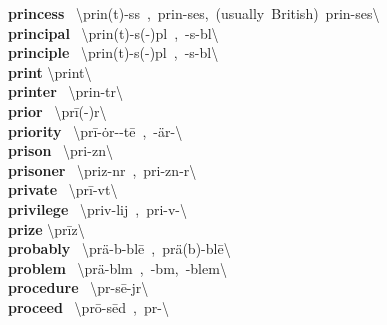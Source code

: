 \documentclass[10pt,a4paper]{article}
\begin{document}
\begin{multicols}{2}
\textbf{ princess }\quad \ \textbackslash \textprimstress prin(t)-s\textschwa s\ ,\ \textprimstress prin-\textsecstress ses,\ (usually\ British)\ prin-\textprimstress ses\textbackslash \\
\textbf{ principal }\quad \ \textbackslash \textprimstress prin(t)-s(\textschwa -)p\textschwa l\ ,\ -s\textschwa -b\textschwa l\textbackslash \\
\textbf{ principle }\quad \ \textbackslash \textprimstress prin(t)-s(\textschwa -)p\textschwa l\ ,\ -s\textschwa -b\textschwa l\textbackslash \\
\textbf{ print }\quad \textbackslash \textprimstress print\textbackslash \\
\textbf{ printer }\quad \ \textbackslash \textprimstress prin-t\textschwa r\textbackslash \\
\textbf{ prior }\quad \ \textbackslash \textprimstress pr\={i}(-\textschwa )r\textbackslash \\
\textbf{ priority }\quad \ \textbackslash pr\={i}-\textprimstress \.{o}r-\textschwa -t\={e}\ ,\ -\textprimstress \"{a}r-\textbackslash \\
\textbf{ prison }\quad \ \textbackslash \textprimstress pri-z\textsuperscript{\textreve}n\textbackslash \\
\textbf{ prisoner }\quad \ \textbackslash \textprimstress priz-n\textschwa r\ ,\ \textprimstress pri-z\textsuperscript{\textreve}n-\textschwa r\textbackslash \\
\textbf{ private }\quad \ \textbackslash \textprimstress pr\={i}-v\textschwa t\textbackslash \\
\textbf{ privilege }\quad \ \textbackslash \textprimstress priv-lij\ ,\ \textprimstress pri-v\textschwa -\textbackslash \\
\textbf{ prize }\quad \textbackslash \textprimstress pr\={i}z\textbackslash \\
\textbf{ probably }\quad \ \textbackslash \textprimstress pr\"{a}-b\textschwa -bl\={e}\ ,\ \textprimstress pr\"{a}(b)-bl\={e}\textbackslash \\
\textbf{ problem }\quad \ \textbackslash \textprimstress pr\"{a}-bl\textschwa m\ ,\ -b\textsuperscript{\textreve}m,\ -\textsecstress blem\textbackslash \\
\textbf{ procedure }\quad \ \textbackslash pr\textschwa -\textprimstress s\={e}-j\textschwa r\textbackslash \\
\textbf{ proceed }\quad \ \textbackslash pr\={o}-\textprimstress s\={e}d\ ,\ pr\textschwa -\textbackslash \\

\end{multicols}
\end{document}
